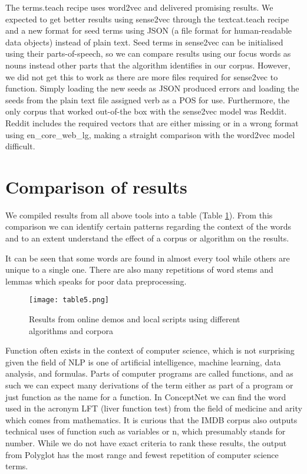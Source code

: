 \documentclass[12pt, usenames, dvipsnames]{report}
\begin{document}
\begin{flushleft}
The terms.teach recipe uses word2vec and delivered promising results.
We expected to get better results using sense2vec through the textcat.teach recipe and a new format for seed terms using JSON (a file format for human-readable data objects) instead of plain text.
Seed terms in sense2vec can be initialised using their parts-of-speech, so we can compare results using our focus words as nouns instead other parts that the algorithm identifies in our corpus.
However, we did not get this to work as there are more files required for sense2vec to function.
Simply loading the new seeds as JSON produced errors and loading the seeds from the plain text file assigned verb as a POS for use.
Furthermore, the only corpus that worked out-of-the box with the sense2vec model was Reddit.
Reddit includes the required vectors that are either missing or in a wrong format using en\_core\_web\_lg, making a straight comparison with the word2vec model difficult.


\section{Comparison of results}

We compiled results from all above tools into a table (Table \ref{fig:table5}).
From this comparison we can identify certain patterns regarding the context of the words and to an extent understand the effect of a corpus or algorithm on the results.

It can be seen that some words are found in almost every tool while others are unique to a single one.
There are also many repetitions of word stems and lemmas which speaks for poor data preprocessing.

\vspace*{1.2em}
\begin{figure}[!htbp]
  \hspace*{-3.666em}
  \texttt{[image: table5.png]}
  \caption{Results from online demos and local scripts using different algorithms and corpora}
  \label{fig:table5}
\end{figure}
\vspace*{1.2em}

Function often exists in the context of computer science, which is not surprising given the field of NLP is one of artificial intelligence, machine learning, data analysis, and formulas.
Parts of computer programs are called functions, and as such we can expect many derivations of the term either as part of a program or just function as the name for a function.
In ConceptNet we can find the word used in the acronym LFT (liver function test) from the field of medicine and arity which comes from mathematics.
It is curious that the IMDB corpus also outputs technical uses of function such as variables or n, which presumably stands for number.
While we do not have exact criteria to rank these results, the output from Polyglot has the most range and fewest repetition of computer science terms.


\end{flushleft}
\end{document}
